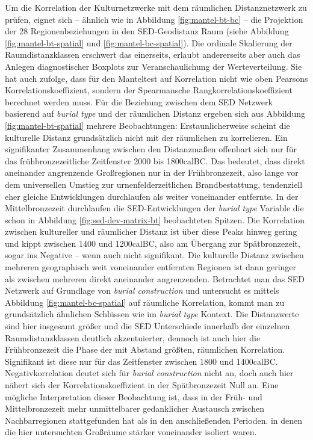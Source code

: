 \documentclass[openany,twoside,twocolumn]{book}
\begin{document}
Um die Korrelation der Kulturnetzwerke mit dem räumlichen Distanznetzwerk zu prüfen, eignet sich -- ähnlich wie in Abbildung \ref{fig:mantel-bt-bc} -- die Projektion der 28 Regionenbeziehungen in den SED-Geodistanz Raum (siehe Abbildung \ref{fig:mantel-bt-spatial} und \ref{fig:mantel-bc-spatial}). Die ordinale Skalierung der Raumdistanzklassen erschwert das einerseits, erlaubt andererseits aber auch das Anlegen diagnostischer Boxplots zur Veranschaulichung der Werteverteilung. Sie hat auch zufolge, dass für den Manteltest auf Korrelation nicht wie oben Pearsons Korrelationskoeffizient, sondern der Spearmansche Rangkorrelationskoeffizient berechnet werden muss. Für die Beziehung zwischen dem SED Netzwerk basierend auf \emph{burial type} und der räumlichen Distanz ergeben sich aus Abbildung \ref{fig:mantel-bt-spatial} mehrere Beobachtungen: Erstaunlicherweise scheint die kulturelle Distanz grundsätzlich nicht mit der räumlichen zu korrelieren. Ein signifikanter Zusammenhang zwischen den Distanzmaßen offenbart sich nur für das frühbronzezeitliche Zeitfenster 2000 bis 1800calBC. Das bedeutet, dass direkt aneinander angrenzende Großregionen nur in der Frühbronzezeit, also lange vor dem universellen Umstieg zur urnenfelderzeitlichen Brandbestattung, tendenziell eher gleiche Entwicklungen durchlaufen als weiter voneinander entfernte. In der Mittelbronzezeit durchlaufen die SED-Entwicklungen der \emph{burial type} Variable die schon in Abbildung \ref{fig:sed-dev-matrix-bt} beobachteten Spitzen. Die Korrelation zwischen kultureller und räumlicher Distanz ist über diese Peaks hinweg gering und kippt zwischen 1400 und 1200calBC, also am Übergang zur Spätbronzezeit, sogar ins Negative -- wenn auch nicht signifikant. Die kulturelle Distanz zwischen mehreren geographisch weit voneinander entfernten Regionen ist dann geringer als zwischen mehreren direkt aneinander angrenzenden. Betrachtet man das SED Netzwerk auf Grundlage von \emph{burial construction} und untersucht es mittels Abbildung \ref{fig:mantel-bc-spatial} auf räumliche Korrelation, kommt man zu grundsätzlich ähnlichen Schlüssen wie im \emph{burial type} Kontext. Die Distanzwerte sind hier insgesamt größer und die SED Unterschiede innerhalb der einzelnen Raumdistanzklassen deutlich akzentuierter, dennoch ist auch hier die Frühbronzezeit die Phase der mit Abstand größten, räumlichen Korrelation. Signifikant ist diese nur für das Zeitfenster zwischen 1800 und 1400calBC. Negativkorrelation deutet sich für \emph{burial construction} nicht an, doch auch hier nähert sich der Korrelationskoeffizient in der Spätbronzezeit Null an. Eine mögliche Interpretation dieser Beobachtung ist, dass in der Früh- und Mittelbronzezeit mehr unmittelbarer gedanklicher Austausch zwischen Nachbarregionen stattgefunden hat als in den anschließenden Perioden. in denen die hier untersuchten Großräume stärker voneinander isoliert waren.
\end{document}
